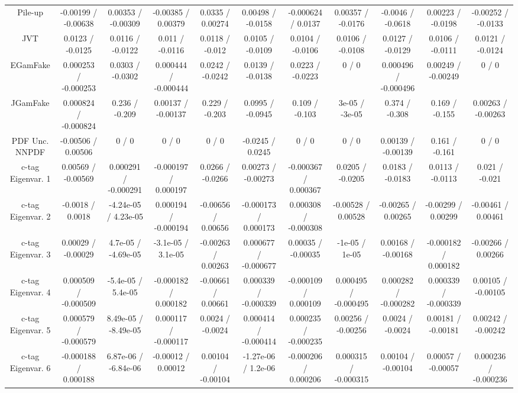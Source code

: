 \begin{table}[htbp]
\begin{center}
\begin{tabular}{|c|c|c|c|c|c|c|c|c|c|c|}
  Pile-up & -0.00199 / -0.00638 & 0.00353 / -0.00309 & -0.00385 / 0.00379 & 0.0335 / 0.00274 & 0.00498 / -0.0158 & -0.000624 / 0.0137 & 0.00357 / -0.0176 & -0.0046 / -0.0618 & 0.00223 / -0.0198 & -0.00252 / -0.0133 \\ 
  JVT & 0.0123 / -0.0125 & 0.0116 / -0.0122 & 0.011 / -0.0116 & 0.0118 / -0.012 & 0.0105 / -0.0109 & 0.0104 / -0.0106 & 0.0106 / -0.0108 & 0.0127 / -0.0129 & 0.0106 / -0.0111 & 0.0121 / -0.0124 \\ 
  EGamFake & 0.000253 / -0.000253 & 0.0303 / -0.0302 & 0.000444 / -0.000444 & 0.0242 / -0.0242 & 0.0139 / -0.0138 & 0.0223 / -0.0223 & 0 / 0 & 0.000496 / -0.000496 & 0.00249 / -0.00249 & 0 / 0 \\ 
  JGamFake & 0.000824 / -0.000824 & 0.236 / -0.209 & 0.00137 / -0.00137 & 0.229 / -0.203 & 0.0995 / -0.0945 & 0.109 / -0.103 & 3e-05 / -3e-05 & 0.374 / -0.308 & 0.169 / -0.155 & 0.00263 / -0.00263 \\ 
  PDF Unc. NNPDF & -0.00506 / 0.00506 & 0 / 0 & 0 / 0 & 0 / 0 & -0.0245 / 0.0245 & 0 / 0 & 0 / 0 & 0.00139 / -0.00139 & 0.161 / -0.161 & 0 / 0 \\ 
  c-tag Eigenvar. 1 & 0.00569 / -0.00569 & 0.000291 / -0.000291 & -0.000197 / 0.000197 & 0.0266 / -0.0266 & 0.00273 / -0.00273 & -0.000367 / 0.000367 & 0.0205 / -0.0205 & 0.0183 / -0.0183 & 0.0113 / -0.0113 & 0.021 / -0.021 \\ 
  c-tag Eigenvar. 2 & -0.0018 / 0.0018 & -4.24e-05 / 4.23e-05 & 0.000194 / -0.000194 & -0.00656 / 0.00656 & -0.000173 / 0.000173 & 0.000308 / -0.000308 & -0.00528 / 0.00528 & -0.00265 / 0.00265 & -0.00299 / 0.00299 & -0.00461 / 0.00461 \\ 
  c-tag Eigenvar. 3 & 0.00029 / -0.00029 & 4.7e-05 / -4.69e-05 & -3.1e-05 / 3.1e-05 & -0.00263 / 0.00263 & 0.000677 / -0.000677 & 0.00035 / -0.00035 & -1e-05 / 1e-05 & 0.00168 / -0.00168 & -0.000182 / 0.000182 & -0.00266 / 0.00266 \\ 
  c-tag Eigenvar. 4 & 0.000509 / -0.000509 & -5.4e-05 / 5.4e-05 & -0.000182 / 0.000182 & -0.00661 / 0.00661 & 0.000339 / -0.000339 & -0.000109 / 0.000109 & 0.000495 / -0.000495 & 0.000282 / -0.000282 & 0.000339 / -0.000339 & 0.00105 / -0.00105 \\ 
  c-tag Eigenvar. 5 & 0.000579 / -0.000579 & 8.49e-05 / -8.49e-05 & 0.000117 / -0.000117 & 0.0024 / -0.0024 & 0.000414 / -0.000414 & 0.000235 / -0.000235 & 0.00256 / -0.00256 & 0.0024 / -0.0024 & 0.00181 / -0.00181 & 0.00242 / -0.00242 \\ 
  c-tag Eigenvar. 6 & -0.000188 / 0.000188 & 6.87e-06 / -6.84e-06 & -0.00012 / 0.00012 & 0.00104 / -0.00104 & -1.27e-06 / 1.2e-06 & -0.000206 / 0.000206 & 0.000315 / -0.000315 & 0.00104 / -0.00104 & 0.00057 / -0.00057 & 0.000236 / -0.000236 \\ 

\end{tabular}
\end{center}
\end{table}
